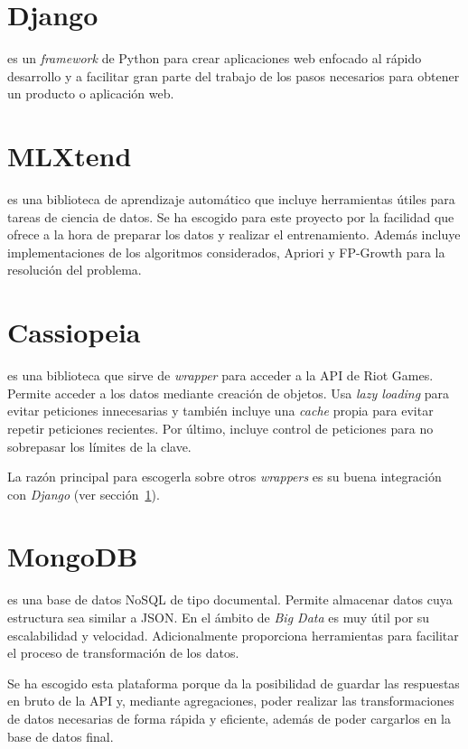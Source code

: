 \section{Django}\label{django}
 es un \textit{framework} de Python para crear aplicaciones web enfocado al rápido desarrollo y a facilitar gran parte del trabajo de los pasos necesarios para obtener un producto o aplicación web.

\section{MLXtend}
 es una biblioteca de aprendizaje automático que incluye herramientas útiles para tareas de ciencia de datos. Se ha escogido para este proyecto por la facilidad que ofrece a la hora de preparar los datos y realizar el entrenamiento. Además incluye implementaciones de los algoritmos considerados, Apriori y FP-Growth para la resolución del problema.

\section{Cassiopeia}
 es una biblioteca que sirve de \textit{wrapper} para acceder a la API de Riot Games. Permite acceder a los datos mediante creación de objetos. Usa \textit{lazy loading} para evitar peticiones innecesarias y también incluye una \textit{cache} propia para evitar repetir peticiones recientes. Por último, incluye control de peticiones para no sobrepasar los límites de la clave.

La razón principal para escogerla sobre otros \textit{wrappers} es su buena integración con \textit{Django} (ver sección~\ref{django}).

\section{MongoDB}
 es una base de datos NoSQL de tipo documental. Permite almacenar datos cuya estructura sea similar a JSON. En el ámbito de \textit{Big Data} es muy útil por su escalabilidad y velocidad. Adicionalmente proporciona herramientas para facilitar el proceso de transformación de los datos.

Se ha escogido esta plataforma porque da la posibilidad de guardar las respuestas en bruto de la API y, mediante agregaciones, poder realizar las transformaciones de datos necesarias de forma rápida y eficiente, además de poder cargarlos en la base de datos final.